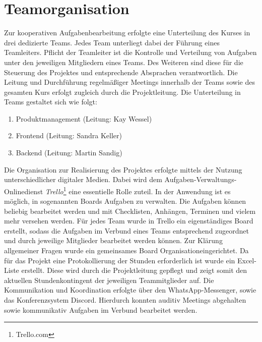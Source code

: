 \section{Teamorganisation}
Zur kooperativen Aufgabenbearbeitung erfolgte eine Unterteilung des Kurses in drei dedizierte Teams. Jedes Team unterliegt dabei der Führung eines Teamleiters. Pflicht der Teamleiter ist die Kontrolle und Verteilung von Aufgaben unter den jeweiligen Mitgliedern eines Teams. Des Weiteren sind diese für die Steuerung des Projektes und entsprechende Absprachen verantwortlich. Die Leitung und Durchführung regelmäßiger Meetings innerhalb der Teams sowie des gesamten Kurs erfolgt zugleich durch die Projektleitung. Die Unterteilung in Teams gestaltet sich wie folgt:
\begin{enumerate}
    \item Produktmanagement (Leitung: Kay Wessel)
    \item Frontend (Leitung: Sandra Keller)
    \item Backend (Leitung: Martin Sandig)
\end{enumerate}

Die Organisation zur Realisierung des Projektes erfolgte mittels der Nutzung unterschiedlicher digitaler Medien. 
Dabei wird dem  Aufgaben-Verwaltungs-Onlinedienst \textit{Trello}\footnote{Trello.com} eine essentielle Rolle zuteil. In der Anwendung ist es möglich, in sogenannten Boards Aufgaben zu verwalten. Die Aufgaben können beliebig bearbeitet werden und mit Checklisten, Anhängen, Terminen und vielem mehr versehen werden.
Für jedes Team wurde in Trello ein eigenständiges Board erstellt, sodass die Aufgaben im Verbund eines Teams entsprechend zugeordnet und durch jeweilige Mitglieder bearbeitet werden können. Zur Klärung allgemeiner Fragen wurde ein gemeinsames Board \glqq Organisation\grqq eingerichtet. Da für das Projekt eine Protokollierung der Stunden erforderlich ist wurde ein Excel-Liste erstellt. Diese wird durch die Projektleitung gepflegt und zeigt somit den aktuellen Stundenkontingent der jeweiligen Teammitglieder auf.
Die Kommunikation und Koordination erfolgte über den WhatsApp-Messenger, sowie das Konferenzsystem Discord. Hierdurch konnten auditiv Meetings abgehalten sowie kommunikativ Aufgaben im Verbund bearbeitet werden. 